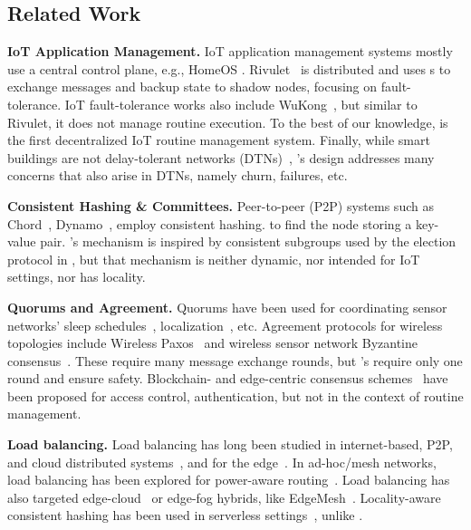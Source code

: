 \subsection{Related Work}
\label{comesh:section:related_work}


\noindent \textbf{IoT Application Management. }
IoT application management systems mostly use a central control plane, 
e.g.,  HomeOS \cite{HomeOS}.
Rivulet~\cite{rivulet} is distributed and uses \smart{}s to exchange messages and backup state to shadow nodes, focusing on fault-tolerance.
IoT fault-tolerance works also include WuKong~\cite{Wukong},
but similar to Rivulet, it does not manage routine execution. 
To the best of our knowledge, \sysname{} is the first decentralized IoT routine management system.
{Finally, while smart buildings are not delay-tolerant networks (DTNs)~\cite{fall2003delay}, \sysname's design addresses many concerns that also arise in DTNs, namely churn, failures, etc.}

\noindent \textbf{Consistent Hashing \& Committees. }
Peer-to-peer (P2P) systems such as Chord~\cite{chord}, Dynamo~\cite{dynamo},
employ consistent hashing.
to find the node storing a key-value pair.
\sysname{}'s \kgroup{} mechanism is inspired by consistent subgroups used by the election protocol in \cite{large_election}, but that mechanism is neither dynamic, nor intended for IoT settings, nor has locality. 

\noindent \textbf{Quorums and Agreement. }
Quorums have been used for coordinating
sensor networks' sleep schedules~\cite{heterogenous-quorum},
localization~\cite{scalable-quorums}, etc.
Agreement protocols for wireless topologies include 
Wireless Paxos~\cite{wirelesspaxos} and wireless sensor network Byzantine consensus~\cite{wchain}.
These require many message exchange rounds, but
\sysname{}'s \kgroups{}
require only one round and ensure safety.
Blockchain- and edge-centric consensus schemes~\cite{khalid2020decentralized,yeow2017decentralized,xu2018blendcac}
have been proposed for access control, authentication, but not in the context of routine management.

\noindent \textbf{Load balancing. }
Load balancing has long been studied in internet-based, P2P, and cloud distributed systems~\cite{mizan},
and for the edge~\cite{presto}.
In ad-hoc/mesh networks, load balancing has been explored for power-aware routing~\cite{1561947}. 
Load balancing has also targeted edge-cloud~\cite{nezami2021decentralized} {or edge-fog hybrids, like EdgeMesh~\cite{sahni2017edge}}.
Locality-aware consistent hashing has been used in serverless settings~\cite{hpdc2022locality},
unlike \sysname.
